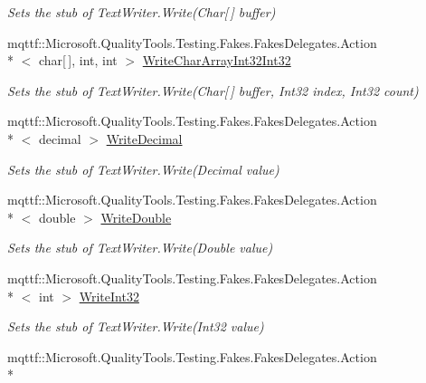\begin{DoxyCompactItemize}
\begin{DoxyCompactList}\small\item\em Sets the stub of Text\-Writer.\-Write(\-Char\mbox{[}$\,$\mbox{]} buffer)\end{DoxyCompactList}\item 
mqttf\-::\-Microsoft.\-Quality\-Tools.\-Testing.\-Fakes.\-Fakes\-Delegates.\-Action\\*
$<$ char\mbox{[}$\,$\mbox{]}, int, int $>$ \hyperlink{class_system_1_1_i_o_1_1_fakes_1_1_stub_text_writer_aac2b39131f9e03044f351f8dd0cc376b}{Write\-Char\-Array\-Int32\-Int32}
\begin{DoxyCompactList}\small\item\em Sets the stub of Text\-Writer.\-Write(\-Char\mbox{[}$\,$\mbox{]} buffer, Int32 index, Int32 count)\end{DoxyCompactList}\item 
mqttf\-::\-Microsoft.\-Quality\-Tools.\-Testing.\-Fakes.\-Fakes\-Delegates.\-Action\\*
$<$ decimal $>$ \hyperlink{class_system_1_1_i_o_1_1_fakes_1_1_stub_text_writer_a10a6ad440fc40904b40c9ef5a9622d8d}{Write\-Decimal}
\begin{DoxyCompactList}\small\item\em Sets the stub of Text\-Writer.\-Write(\-Decimal value)\end{DoxyCompactList}\item 
mqttf\-::\-Microsoft.\-Quality\-Tools.\-Testing.\-Fakes.\-Fakes\-Delegates.\-Action\\*
$<$ double $>$ \hyperlink{class_system_1_1_i_o_1_1_fakes_1_1_stub_text_writer_a9930f33edb41a7ec3d67159c89a9ccf0}{Write\-Double}
\begin{DoxyCompactList}\small\item\em Sets the stub of Text\-Writer.\-Write(\-Double value)\end{DoxyCompactList}\item 
mqttf\-::\-Microsoft.\-Quality\-Tools.\-Testing.\-Fakes.\-Fakes\-Delegates.\-Action\\*
$<$ int $>$ \hyperlink{class_system_1_1_i_o_1_1_fakes_1_1_stub_text_writer_a681a983ea51d4db8540f5a3ad3325a5a}{Write\-Int32}
\begin{DoxyCompactList}\small\item\em Sets the stub of Text\-Writer.\-Write(\-Int32 value)\end{DoxyCompactList}\item 
mqttf\-::\-Microsoft.\-Quality\-Tools.\-Testing.\-Fakes.\-Fakes\-Delegates.\-Action\\*

\end{DoxyCompactItemize}
